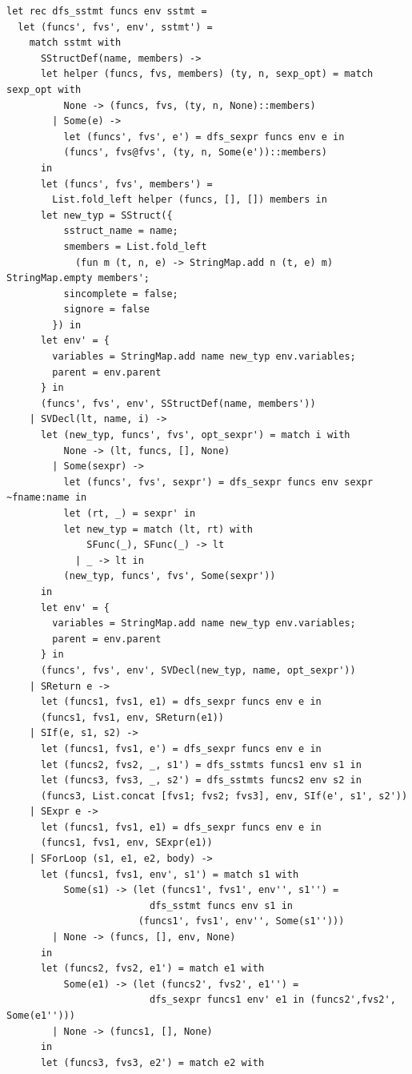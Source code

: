 \documentclass[12pt]{article}
\begin{document}
\begin{mdframed}[hidealllines=true,backgroundcolor=blue!20]
\begin{lstlisting}
let rec dfs_sstmt funcs env sstmt =
  let (funcs', fvs', env', sstmt') =
    match sstmt with
      SStructDef(name, members) ->
      let helper (funcs, fvs, members) (ty, n, sexp_opt) = match sexp_opt with
          None -> (funcs, fvs, (ty, n, None)::members)
        | Some(e) ->
          let (funcs', fvs', e') = dfs_sexpr funcs env e in
          (funcs', fvs@fvs', (ty, n, Some(e'))::members)
      in
      let (funcs', fvs', members') = 
        List.fold_left helper (funcs, [], []) members in
      let new_typ = SStruct({
          sstruct_name = name;
          smembers = List.fold_left 
            (fun m (t, n, e) -> StringMap.add n (t, e) m) StringMap.empty members';
          sincomplete = false;
          signore = false
        }) in
      let env' = {
        variables = StringMap.add name new_typ env.variables;
        parent = env.parent
      } in
      (funcs', fvs', env', SStructDef(name, members'))
    | SVDecl(lt, name, i) ->
      let (new_typ, funcs', fvs', opt_sexpr') = match i with
          None -> (lt, funcs, [], None)
        | Some(sexpr) ->
          let (funcs', fvs', sexpr') = dfs_sexpr funcs env sexpr ~fname:name in
          let (rt, _) = sexpr' in
          let new_typ = match (lt, rt) with
              SFunc(_), SFunc(_) -> lt
            | _ -> lt in
          (new_typ, funcs', fvs', Some(sexpr'))
      in
      let env' = {
        variables = StringMap.add name new_typ env.variables;
        parent = env.parent
      } in
      (funcs', fvs', env', SVDecl(new_typ, name, opt_sexpr'))
    | SReturn e -> 
      let (funcs1, fvs1, e1) = dfs_sexpr funcs env e in
      (funcs1, fvs1, env, SReturn(e1))
    | SIf(e, s1, s2) ->
      let (funcs1, fvs1, e') = dfs_sexpr funcs env e in
      let (funcs2, fvs2, _, s1') = dfs_sstmts funcs1 env s1 in
      let (funcs3, fvs3, _, s2') = dfs_sstmts funcs2 env s2 in
      (funcs3, List.concat [fvs1; fvs2; fvs3], env, SIf(e', s1', s2'))
    | SExpr e ->
      let (funcs1, fvs1, e1) = dfs_sexpr funcs env e in
      (funcs1, fvs1, env, SExpr(e1))
    | SForLoop (s1, e1, e2, body) ->
      let (funcs1, fvs1, env', s1') = match s1 with 
          Some(s1) -> (let (funcs1', fvs1', env'', s1'') = 
                         dfs_sstmt funcs env s1 in 
                       (funcs1', fvs1', env'', Some(s1'')))
        | None -> (funcs, [], env, None) 
      in
      let (funcs2, fvs2, e1') = match e1 with
          Some(e1) -> (let (funcs2', fvs2', e1'') = 
                         dfs_sexpr funcs1 env' e1 in (funcs2',fvs2', Some(e1'')))
        | None -> (funcs1, [], None)
      in
      let (funcs3, fvs3, e2') = match e2 with

\end{lstlisting}
\end{mdframed}
\end{document}
